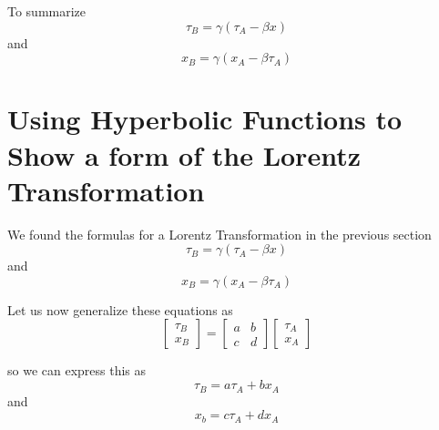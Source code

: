 \documentclass{article}
\begin{document}
To summarize
\[
  \tau_B = \gamma ( \tau_A - \beta x)
\]
and
\[
  x_B = \gamma (x_A - \beta \tau_A)
\]
\newpage
\section{Using Hyperbolic Functions to Show a form of the Lorentz Transformation}
We found the formulas for a Lorentz Transformation in the previous section
\[
  \tau_B = \gamma ( \tau_A - \beta x)
\]
and
\[
  x_B = \gamma (x_A - \beta \tau_A)
\]

Let us now generalize these equations as
\[
  \begin{bmatrix} 
    \tau_B \\
    x_B
  \end{bmatrix}
=
  \begin{bmatrix} 
    a & b \\
    c & d
  \end{bmatrix}
  \begin{bmatrix} 
    \tau_A \\
    x_A
  \end{bmatrix}
\]

so we can express this as
\[
  \tau_B = a\tau_A + bx_A
\]
and 
\[
  x_b = c\tau_A + dx_A
\]
\end{document}
